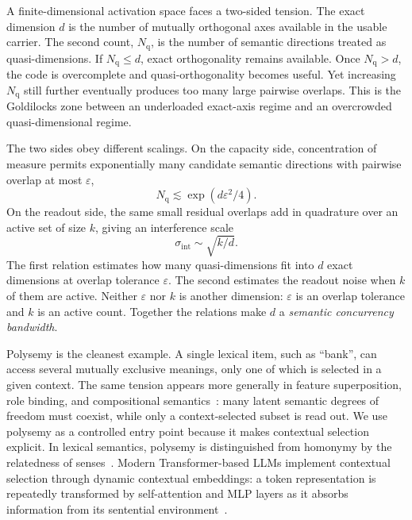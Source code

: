 \documentclass[
  aps,
  reprint,
  superscriptaddress,
  floatfix,
  nofootinbib,
  longbibliography
]{revtex4-2}
\newcommand{\Nq}{N_{\mathrm q}}
\newcommand{\sint}{\sigma_{\mathrm{int}}}
\begin{document}
A finite-dimensional activation space faces a two-sided tension.  The exact
dimension $d$ is the number of mutually orthogonal axes available in the
usable carrier.  The second count, $\Nq$, is the number of semantic directions
treated as quasi-dimensions.  If $\Nq\leq d$, exact orthogonality remains
available.  Once $\Nq>d$, the code is overcomplete and quasi-orthogonality
becomes useful.  Yet increasing $\Nq$ still further eventually produces too
many large pairwise overlaps.  This is the Goldilocks zone between an
underloaded exact-axis regime and an overcrowded quasi-dimensional regime.

The two sides obey different scalings. On the capacity side,
concentration of measure permits exponentially many candidate semantic
directions with pairwise overlap at most $\varepsilon$,
%
\begin{equation}
\label{eq:intro-capacity}
\Nq\lesssim \exp(d\varepsilon^{2}/4).
\end{equation}
%
On the readout side, the same small residual overlaps add in quadrature
over an active set of size $k$, giving an interference scale
%
\begin{equation}
\label{eq:intro-readout}
\sint\sim\sqrt{k/d}.
\end{equation}
%
The first relation estimates how many quasi-dimensions fit into $d$ exact
dimensions at overlap tolerance $\varepsilon$.  The second estimates the
readout noise when $k$ of them are active.  Neither $\varepsilon$ nor $k$ is
another dimension: $\varepsilon$ is an overlap tolerance and $k$ is an active
count.  Together the relations make $d$ a \emph{semantic concurrency
bandwidth}.

Polysemy is the cleanest example. A single lexical item, such as
``bank'', can access several mutually exclusive meanings, only one of
which is selected in a given context. The same tension appears more
generally in feature superposition, role binding, and compositional
semantics~\cite{mikolov2013}: many latent semantic degrees of freedom
must coexist, while only a context-selected subset is read out. We use
polysemy as a controlled entry point because it makes contextual
selection explicit. In lexical semantics, polysemy is distinguished
from homonymy by the relatedness of senses~\cite{pustejovsky1995}.
Modern Transformer-based LLMs implement contextual selection through
dynamic contextual embeddings: a token representation is repeatedly
transformed by self-attention and MLP layers as it absorbs information
from its sentential environment~\cite{Vaswani-2017-Attention}.
\end{document}
